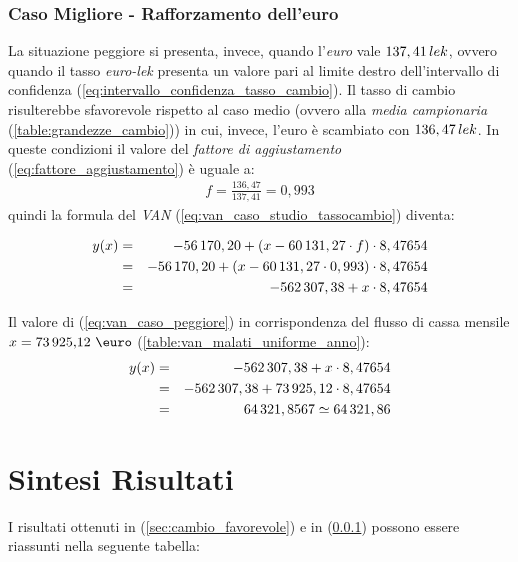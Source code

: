 \subsubsection[Caso Migliore - Rafforzamento dell'euro]{Caso Migliore - Rafforzamento dell'euro}
\label{sec:cambio_sfavorevole}
La situazione peggiore si presenta, invece, quando l'\emph{euro} vale $137,41 \thinspace lek$, ovvero quando il tasso \emph{euro-lek} presenta un valore pari al limite destro dell'intervallo di confidenza (\ref{eq:intervallo_confidenza_tasso_cambio}). Il tasso di cambio risulterebbe sfavorevole rispetto al caso medio (ovvero alla \textit{media campionaria} (\ref{table:grandezze_cambio})) in cui, invece, l'euro è scambiato con $136,47 \thinspace lek$.\newline
In queste condizioni il valore del \textit{fattore di aggiustamento}  (\ref{eq:fattore_aggiustamento}) è uguale a:
\begin{equation}
\label{eq:fattore_aggiustamento_caso_peggiore}
\begin{split}
f = \frac{136,47}{137,41} = 0,993
\end{split}
\end{equation}
quindi la formula del \emph{\ac{VAN}} (\ref{eq:van_caso_studio_tassocambio}) diventa:

\begin{eqnarray}
\label{eq:van_caso_peggiore}
 		y(x) & = & -56\thinspace 170,20 + (x - 60\thinspace 131,27 \cdot f) \cdot 8,47654 \nonumber \\
 			 & = & -56\thinspace 170,20 + (x - 60\thinspace 131,27 \cdot 0,993) \cdot 8,47654 \nonumber \\
 			 & = & -562\thinspace 307,38 + x \cdot 8,47654
\end{eqnarray}

Il valore di (\ref{eq:van_caso_peggiore}) in corrispondenza del flusso di cassa mensile $ x = \mbox{73\thinspace 925,12 \euro}$ (\ref{table:van_malati_uniforme_anno}):
\begin{eqnarray}
\label{eq:van_flusso_cassa_malati_uniforme_caso_peggiore}
 		y(x) & = & -562\thinspace 307,38 + x \cdot 8,47654 \nonumber \\
 			 & = & -562\thinspace 307,38 + 73\thinspace 925,12 \cdot 8,47654 \nonumber \\
 			 & = & 64\thinspace 321,8567 \simeq 64\thinspace 321,86
\end{eqnarray}


\section[Sintesi Risultati]{Sintesi Risultati}
I risultati ottenuti in (\ref{sec:cambio_favorevole}) e in (\ref{sec:cambio_sfavorevole}) possono essere riassunti nella seguente tabella:


